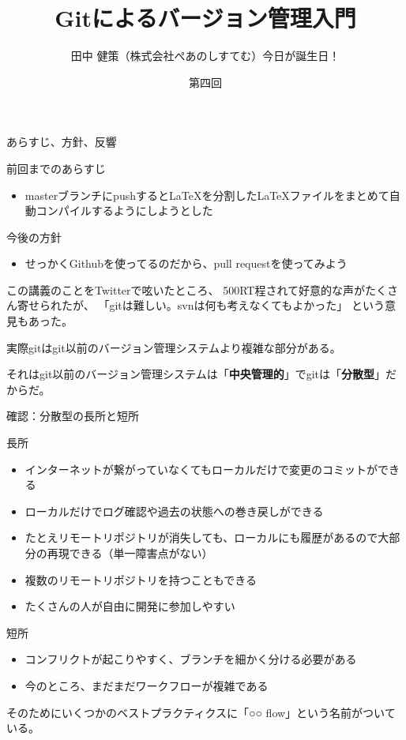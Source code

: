 \documentclass[12pt, unicode]{beamer}
\title{Gitによるバージョン管理入門}
\author{田中 健策（株式会社ぺあのしすてむ）今日が誕生日！}
\date[2019/10/25]{第四回}
\begin{document}
\frame{\maketitle}

\begin{frame}{あらすじ、方針、反響}

前回までのあらすじ
\begin{itemize}
\item masterブランチにpushするとLaTeXを分割した\LaTeX ファイルをまとめて自動コンパイルするようにしようとした
\end{itemize}

今後の方針
\begin{itemize}
\item せっかくGithubを使ってるのだから、pull requestを使ってみよう
\end{itemize}

この講義のことをTwitterで呟いたところ、
500RT程されて好意的な声がたくさん寄せられたが、
「gitは難しい。svnは何も考えなくてもよかった」
という意見もあった。

実際gitはgit以前のバージョン管理システムより複雑な部分がある。

それはgit以前のバージョン管理システムは「\textbf{中央管理的}」でgitは「\textbf{分散型}」だからだ。
\end{frame}

\begin{frame}{確認：分散型の長所と短所}

長所
\begin{itemize}
\item インターネットが繋がっていなくてもローカルだけで変更のコミットができる
\item ローカルだけでログ確認や過去の状態への巻き戻しができる
\item たとえリモートリポジトリが消失しても、ローカルにも履歴があるので大部分の再現できる（単一障害点がない）
\item 複数のリモートリポジトリを持つこともできる
\item たくさんの人が自由に開発に参加しやすい
\end{itemize}

短所
\begin{itemize}
\item コンフリクトが起こりやすく、ブランチを細かく分ける必要がある
\item 今のところ、まだまだワークフローが複雑である
\end{itemize}

そのためにいくつかのベストプラクティクスに「○○ flow」という名前がついている。

\end{frame}
\end{document}
